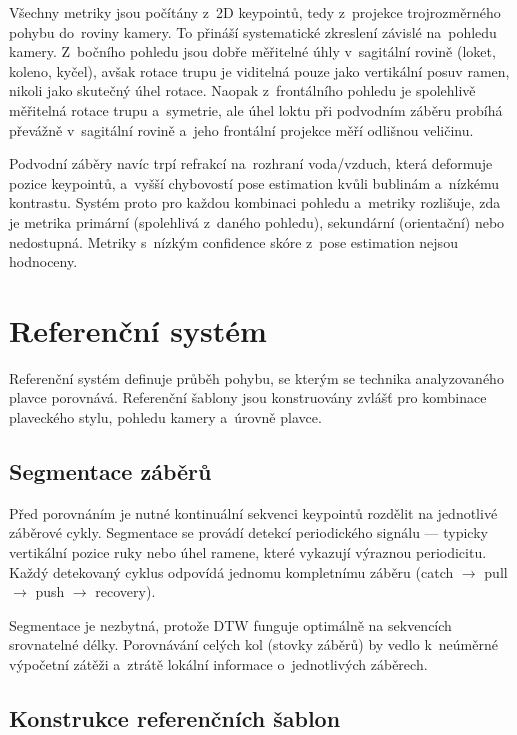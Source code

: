 Všechny metriky jsou počítány z~2D keypointů, tedy z~projekce trojrozměrného pohybu do~roviny kamery. To přináší systematické zkreslení závislé na~pohledu kamery. Z~bočního pohledu jsou dobře měřitelné úhly v~sagitální rovině (loket, koleno, kyčel), avšak rotace trupu je viditelná pouze jako vertikální posuv ramen, nikoli jako skutečný úhel rotace. Naopak z~frontálního pohledu je spolehlivě měřitelná rotace trupu a~symetrie, ale úhel loktu při podvodním záběru probíhá převážně v~sagitální rovině a~jeho frontální projekce měří odlišnou veličinu.

Podvodní záběry navíc trpí refrakcí na~rozhraní voda/vzduch, která deformuje pozice keypointů, a~vyšší chybovostí pose estimation kvůli bublinám a~nízkému kontrastu. Systém proto pro každou kombinaci pohledu a~metriky rozlišuje, zda je metrika primární (spolehlivá z~daného pohledu), sekundární (orientační) nebo nedostupná. Metriky s~nízkým confidence skóre z~pose estimation nejsou hodnoceny.

\section{Referenční systém}
\label{sec:referencni_system}

Referenční systém definuje  průběh pohybu, se kterým se technika analyzovaného plavce porovnává. Referenční šablony jsou konstruovány zvlášť pro kombinace plaveckého stylu, pohledu kamery a~úrovně plavce.

\subsection{Segmentace záběrů}

Před porovnáním je nutné kontinuální sekvenci keypointů rozdělit na jednotlivé záběrové cykly. Segmentace se provádí detekcí periodického signálu --- typicky vertikální pozice ruky nebo úhel ramene, které vykazují výraznou periodicitu. Každý detekovaný cyklus odpovídá jednomu kompletnímu záběru (catch $\rightarrow$ pull $\rightarrow$ push $\rightarrow$ recovery).

Segmentace je nezbytná, protože DTW funguje optimálně na sekvencích srovnatelné délky. Porovnávání celých kol (stovky záběrů) by vedlo k~neúměrné výpočetní zátěži a~ztrátě lokální informace o~jednotlivých záběrech.

\subsection{Konstrukce referenčních šablon}


